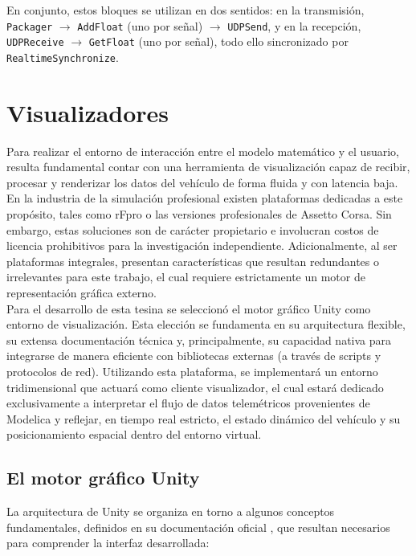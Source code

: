 En conjunto, estos bloques se utilizan en dos sentidos:  en la transmisión, \verb|Packager| $\rightarrow$ \verb|AddFloat| (uno por señal) $\rightarrow$ \verb|UDPSend|, y en la recepción, \verb|UDPReceive| $\rightarrow$ \verb|GetFloat| (uno por señal), todo ello sincronizado por \verb|RealtimeSynchronize|.


\section{Visualizadores}
Para realizar el entorno de interacción entre el modelo matemático y el usuario, resulta fundamental contar con una herramienta de visualización capaz de recibir, procesar y renderizar los datos del vehículo de forma fluida y con latencia baja. En la industria de la simulación profesional existen plataformas dedicadas a este propósito, tales como rFpro o las versiones profesionales de Assetto Corsa. Sin embargo, estas soluciones son de carácter propietario e involucran costos de licencia prohibitivos para la investigación independiente. Adicionalmente, al ser plataformas integrales, presentan características que resultan redundantes o irrelevantes para este trabajo, el cual requiere estrictamente un motor de representación gráfica externo.
\\

Para el desarrollo de esta tesina se seleccionó el motor gráfico Unity como entorno de visualización. Esta elección se fundamenta en su arquitectura flexible, su extensa documentación técnica y, principalmente, su capacidad nativa para integrarse de manera eficiente con bibliotecas externas (a través de scripts y protocolos de red). Utilizando esta plataforma, se implementará un entorno tridimensional que actuará como cliente visualizador, el cual estará dedicado exclusivamente a interpretar el flujo de datos telemétricos provenientes de Modelica y reflejar, en tiempo real estricto, el estado dinámico del vehículo y su posicionamiento espacial dentro del entorno virtual. \\


\subsection{El motor gráfico Unity}

La arquitectura de Unity se organiza en torno a algunos conceptos fundamentales, definidos en su documentación oficial \cite{unity_docs}, que resultan necesarios para comprender la interfaz desarrollada:

